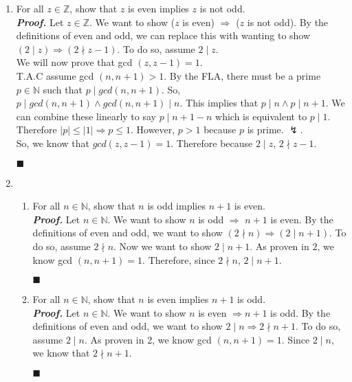 \documentclass[11pt,a4paper]{article}
\begin{document}
\begin{enumerate}
    \item 
    For all $z \in \mathbb{Z} $, show that $z$ is even implies $z$ is not odd. \\
    \emph{\textbf{Proof.}} Let $z \in \mathbb{Z}$. We want to show ($z$ is even) $\Rightarrow $ ($z$ is not odd).
    By the definitions of even and odd, we can replace this with wanting to show $(2 \mid z) \Rightarrow (2 \nmid z - 1) $.
    To do so, assume $2 \mid z $. \\
    We will now prove that gcd $(z, z - 1) = 1 $. \\
    T.A.C assume gcd $(n, n + 1) > 1 $. By the FLA, there must be a prime $p \in \mathbb{N}$ such that $p \mid gcd (n, n + 1) $.
    So, $p \mid gcd (n, n + 1) \land gcd (n, n + 1) \mid n $. This implies that $p \mid n \land p \mid n + 1 $.
    We can combine these linearly to say $p \mid n + 1 - n $ which is equivalent to $p \mid 1 $. Therefore $ | p | \leq | 1| \Rightarrow p \leq 1$.
    However, $ p > 1$ because $p$ is prime. $\lightning$.       \\
    So, we know that $ gcd (z, z - 1) = 1$. Therefore because $ 2 \mid z $, $2 \nmid z - 1 $.
    \begin{flushright}
        $\blacksquare$
    \end{flushright}
    \item 
    \begin{enumerate}
        \item 
        For all $n \in \mathbb{N}$, show that $n$ is odd implies $n + 1$ is even. \\
        \emph{\textbf{Proof.}} Let $n \in \mathbb{N} $. We want to show $n$ is odd $\Rightarrow$ $n + 1$ is even. 
        By the definitions of even and odd, we want to show $(2 \nmid n) \Rightarrow (2 \mid n + 1) $. To do so, assume $2 \nmid n $. 
        Now we want to show $2 \mid n + 1 $. As proven in $2$, we know gcd $(n, n + 1) = 1 $. Therefore, since $2 \nmid n $, $2 \mid n + 1 $.
        \begin{flushright}
            $\blacksquare$
        \end{flushright}

        \item 
        For all $n \in \mathbb{N} $, show that $n$ is even implies $n + 1$ is odd. \\
        \emph{\textbf{Proof.}} Let $n \in \mathbb{N} $. We want to show $n$ is even $\Rightarrow n + 1$ is odd. By the definitions of even and odd, 
        we want to show $2 \mid n \Rightarrow 2 \nmid n + 1 $. To do so, assume $2 \mid n $. 
        As proven in 2, we know gcd $(n, n + 1) = 1 $. Since $2 \mid n $, we know that $2 \nmid n + 1 $.
        \begin{flushright}
            $\blacksquare$
        \end{flushright}


\end{enumerate}
\end{enumerate}
\end{document}
